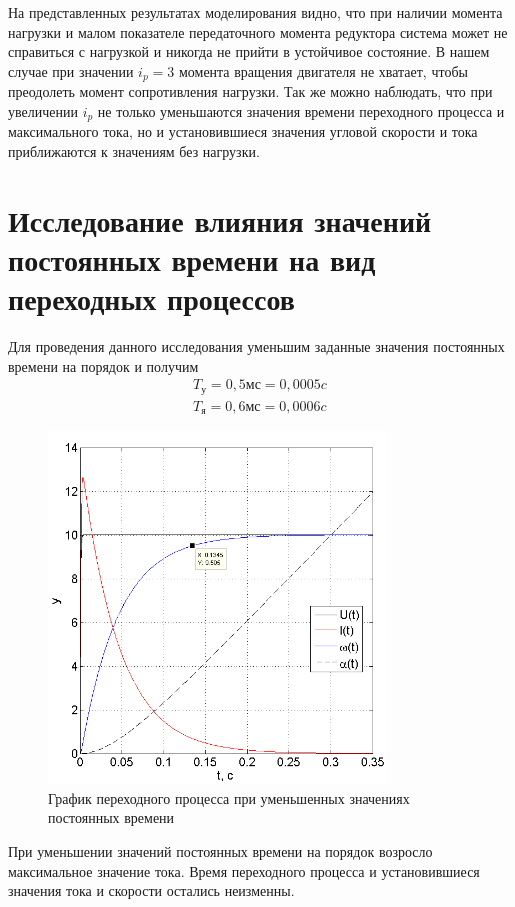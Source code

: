 \documentclass[fleqn, a4paper, 11pt, russian]{article}
\begin{document}
	На представленных результатах моделирования видно, что при наличии момента нагрузки и малом показателе передаточного момента редуктора система может не справиться с нагрузкой и никогда не прийти в устойчивое состояние. В нашем случае при значении $i_p = 3$ момента вращения двигателя не хватает, чтобы преодолеть момент сопротивления нагрузки. Так же можно наблюдать, что при увеличении $i_p$ не только уменьшаются значения времени переходного процесса и максимального тока, но и установившиеся значения угловой скорости и тока приближаются к значениям без нагрузки.
	\clearpage
	\section{Исследование влияния значений постоянных времени на вид переходных процессов}
	Для проведения данного исследования уменьшим заданные значения постоянных времени на порядок и получим
	\begin{align}
		T_\text{у} = 0,5 \text{мс} = 0,0005 c\\
		T_\text{я} = 0,6 \text{мс} = 0,0006 c
	\end{align}
	\begin{figure}[ht!]
		\centering
		\includegraphics[width = 0.8\textwidth]{Tvar}
		\caption{График переходного процесса при уменьшенных значениях постоянных времени}
		\label{TVar}
	\end{figure}
	
	При уменьшении значений постоянных времени на порядок возросло максимальное значение тока. Время переходного процесса и установившиеся значения тока и скорости остались неизменны.
	\clearpage
\end{document}
